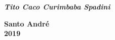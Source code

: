 \begin{titlepage}
		\vspace{1.0cm}

		\textit{\textbf{\LARGE Tito Caco Curimbaba Spadini}}\\[1.0cm]


		\vspace{0.5cm}


		{\textbf{\large Santo André}\\ \vspace{0.5cm}\textbf{\large 2019}}\\[2cm]

	\end{titlepage}

